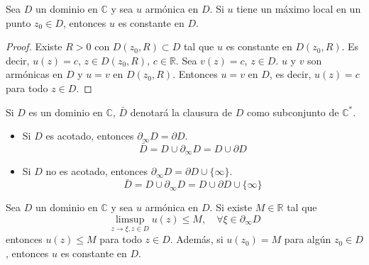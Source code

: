 \begin{theorem}
    Sea $D$ un dominio en $\mathbb{C}$ y sea $u$ armónica en $D$.
    Si $u$ tiene un máximo local en un punto $z_0 \in D$, entonces $u$ es constante en $D$.
\end{theorem}

\begin{proof}
    Existe $R > 0$ con $D(z_0, R) \subset D$ tal que $u$ es constante en $D(z_0, R)$.
    Es decir, $u(z) = c$, $z \in D(z_0, R)$, $c \in \mathbb{R}$.
    Sea $v(z) = c$, $z \in D$.
    $u$ y $v$ son armónicas en $D$ y $u = v$ en $D(z_0, R)$.
    Entonces $u = v$ en $D$, es decir, $u(z) = c$ para todo $z \in D$.
\end{proof}

\begin{notation}
    Si $D$ es un dominio en $\mathbb{C}$, $\bar{D}$ denotará la clausura de $D$ como subconjunto de $\mathbb{C}^\ast$.
    \begin{itemize}
        \item Si $D$ es acotado, entonces $\partial_\infty D = \partial D$.
              $$\bar{D} = D \cup \partial_\infty D = D \cup \partial D$$
        \item Si $D$ no es acotado, entonces $\partial_\infty D = \partial D \cup \{\infty\}$.
              $$\bar{D} = D \cup \partial_\infty D = D \cup \partial D \cup \{\infty\}$$
    \end{itemize}
\end{notation}

\begin{theorem}
    Sea $D$ un dominio en $\mathbb{C}$ y sea $u$ armónica en $D$.
    Si existe $M \in \mathbb{R}$ tal que
    $$\limsup_{z \to \xi, z \in D} u(z) \leq M, \quad \forall \xi \in \partial_\infty D$$
    entonces $u(z) \leq M$ para todo $z \in D$.
    Además, si $u(z_0) = M$ para algún $z_0 \in D$, entonces $u$ es constante en $D$.
\end{theorem}

